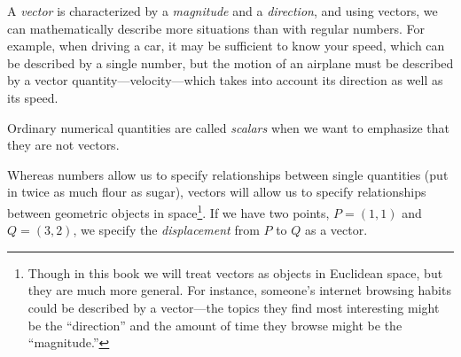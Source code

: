 
\newpage
A \emph{vector} is characterized by
a \emph{magnitude} and a \emph{direction}, and using vectors, we can
mathematically describe more situations than with regular numbers.
For example, when driving a car,
 it may be sufficient to
know your speed, which can be described by a single number,
 but the motion of an airplane must be described
by a vector quantity---velocity---which takes into account its
direction as well as its speed.

Ordinary numerical quantities are called \emph{scalars}
when we want to emphasize that they are not vectors.

Whereas numbers allow us to specify relationships between single quantities
(put in twice as much flour as sugar), vectors will allow us to specify
relationships between geometric objects in space\footnote{
	Though in this book we will treat vectors as objects in Euclidean
	space, but they are much more general.  For instance, someone's internet
	browsing habits could be described by a vector---the topics they
	find most interesting might be the ``direction'' and the amount
	of time they browse might be the ``magnitude.''
}.  If we have two points, $P=(1,1)$ and $Q=(3,2)$, we specify the
\emph{displacement} from $P$ to $Q$ as a vector.

\begin{center}
	\usetikzlibrary{patterns,decorations.pathreplacing}
\end{center}

